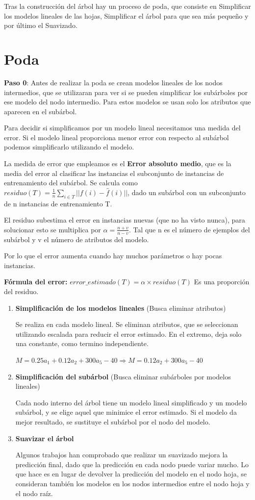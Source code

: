 \documentclass[12pt, twoside, openright]{report} %
\begin{document}
Tras la construcción del árbol hay un proceso de poda, que consiste en
Simplificar los modelos lineales de las hojas, Simplificar el árbol para
que sea más pequeño y por último el Suavizado.
\pagebreak
\section{Poda}

\textbf{Paso 0}: Antes de realizar la poda se crean modelos lineales de los nodos
intermedios, que se utilizaran para ver si se pueden simplificar los subárboles por ese modelo del nodo intermedio. Para estos modelos se usan solo los atributos que aparecen en el subárbol.

Para decidir si simplificamos por un modelo lineal necesitamos una
medida del error. Si el modelo lineal proporciona menor error con
respecto al subárbol podemos simplificarlo utilizando el modelo.

La medida de error que empleamos es el \textbf{Error absoluto medio},
que es la media del error al clasificar las instancias el subconjunto de
instancias de entrenamiento del subárbol. Se calcula como $residuo(T) = \frac 1 n \sum _{i \in T} ||f(i)- \hat{f}(i)||$, dado un
subárbol con un subconjunto de n instancias de entrenamiento T.

El residuo subestima el error en instancias nuevas (que no ha visto
nunca), para solucionar esto se multiplica por
\(\alpha = \frac {n+v}{n-v}\). Tal que n es el número de ejemplos del
subárbol y v el número de atributos del modelo.

Por lo que el error aumenta cuando hay muchos parámetros o hay pocas
instancias.

\textbf{Fórmula del error:}
\(error\_estimado(T) = \alpha \times residuo(T)\) Es una proporción del
residuo.

\begin{enumerate}
\def\labelenumi{\arabic{enumi}.}
\item
  \textbf{Simplificación de los modelos lineales} (Busca eliminar
  atributos)

  Se realiza en cada modelo lineal. Se eliminan atributos, que se seleccionan utilizando escalada para reducir el error estimado. En el extremo, deja solo una constante, como termino independiente.

  \(M= 0.25a_1+0.12a_2+300a_5-40 \Rightarrow M=0.12a_2+300a_5-40\)
\item
\textbf{Simplificación del subárbol} (Busca eliminar subárboles por modelos
  lineales)

  Cada nodo interno del árbol tiene un modelo lineal simplificado y un
  modelo subárbol, y se elige aquel que minimice el error estimado. Si
  el modelo da mejor resultado, se sustituye el subárbol por el nodo del
  modelo.
\item
  \textbf{Suavizar el árbol}

  Algunos trabajos han comprobado que realizar un suavizado mejora la predicción final, dado que la predicción en cada nodo puede variar
  mucho. Lo que hace es en lugar de devolver la predicción del modelo en
  el nodo hoja, se consideran también los modelos en los nodos
  intermedios entre el nodo hoja y el nodo raíz.
\end{enumerate}
\end{document}
